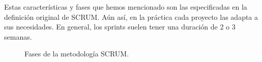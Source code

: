Estas características y fases que hemos mencionado son las especificadas en la definición original de SCRUM. Aún así, en la práctica cada proyecto las adapta a sus necesidades. En general, los sprints suelen tener una duración de 2 o 3 semanas. 

\begin{figure}[H]
\centering
    \caption{Fases de la metodología SCRUM. \cite{schwaber1997scrum}} 
    \label{fig:scrum}
\end{figure}

